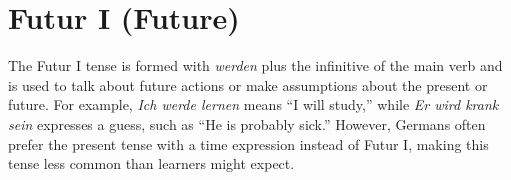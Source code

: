 \section{Futur I (Future)}
The Futur I tense is formed with \textit{werden} plus the infinitive of the main verb and is used to talk about future actions or make assumptions about the present or future. For example, \textit{Ich werde lernen} means “I will study,” while \textit{Er wird krank sein} expresses a guess, such as “He is probably sick.” However, Germans often prefer the present tense with a time expression instead of Futur I, making this tense less common than learners might expect.
